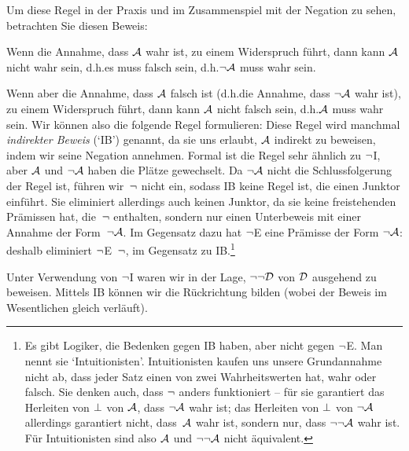 Um diese Regel in der Praxis und im Zusammenspiel mit der Negation zu sehen, betrachten Sie diesen Beweis:
	\begin{fitchproof}
		\open
		\close
	\end{fitchproof}

Wenn die Annahme, dass $\mathcal{A}$ wahr ist, zu einem Widerspruch führt, dann kann $\mathcal{A}$ nicht wahr sein, d.h.\@ es muss falsch sein, d.h.\@ $\neg\mathcal{A}$ muss wahr sein. 

Wenn aber die Annahme, dass $\mathcal{A}$ falsch ist (d.h.\@ die Annahme, dass $\neg\mathcal{A}$ wahr ist), zu einem Widerspruch führt, dann kann $\mathcal{A}$ nicht falsch sein, d.h.\@ $\mathcal{A}$ muss wahr sein. Wir können also die folgende Regel formulieren:
Diese Regel wird manchmal \emph{indirekter Beweis} (`IB') genannt, da sie uns erlaubt, $\mathcal{A}$ indirekt zu beweisen, indem wir seine Negation annehmen. Formal ist die Regel sehr ähnlich zu $\neg$I, aber $\mathcal{A}$ und $\neg\mathcal{A}$ haben die Plätze gewechselt. Da $\neg\mathcal{A}$ nicht die Schlussfolgerung der Regel ist, führen wir~$\neg$ nicht ein, sodass IB keine Regel ist, die einen Junktor einführt. Sie eliminiert allerdings auch keinen Junktor, da sie keine freistehenden Prämissen hat, die~$\neg$ enthalten, sondern nur einen Unterbeweis mit einer Annahme der Form~$\neg\mathcal{A}$. Im Gegensatz dazu hat $\neg$E eine Prämisse der Form $\neg\mathcal{A}$: deshalb eliminiert $\neg$E~$\neg$, im Gegensatz zu IB.\footnote{Es gibt Logiker, die Bedenken gegen IB haben, aber nicht gegen $\neg$E. Man nennt sie `Intuitionisten'. Intuitionisten kaufen uns unsere Grundannahme nicht ab, dass jeder Satz einen von zwei Wahrheitswerten hat, wahr oder falsch. Sie denken auch, dass $\neg$ anders funktioniert -- für sie garantiert das Herleiten von $\bot$ von $\mathcal{A}$, dass $\neg \mathcal{A}$ wahr ist; das Herleiten von $\bot$ von $\neg\mathcal{A}$ allerdings garantiert nicht, dass~$\mathcal{A}$ wahr ist, sondern nur, dass $\neg\neg\mathcal{A}$ wahr ist. Für Intuitionisten sind also $\mathcal{A}$ und $\neg\neg\mathcal{A}$ nicht äquivalent.} 

Unter Verwendung von $\neg$I waren wir in der Lage, $\neg\neg\mathcal{D}$ von $\mathcal{D}$ ausgehend zu beweisen. Mittels IB können wir die Rückrichtung bilden (wobei der Beweis im Wesentlichen gleich verläuft).
	\begin{fitchproof}
		\open
		\close
	\end{fitchproof}

